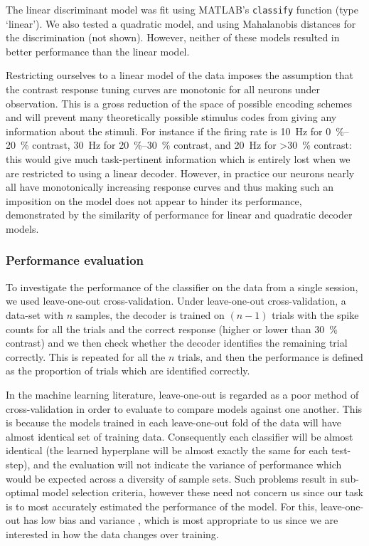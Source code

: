 The linear discriminant model was fit using MATLAB's \texttt{classify} function (type `linear').
We also tested a quadratic model, and using Mahalanobis distances for the discrimination (not shown).
However, neither of these models resulted in better performance than the linear model.

Restricting ourselves to a linear model of the data imposes the assumption that the contrast response tuning curves are monotonic for all neurons under observation.
This is a gross reduction of the space of possible encoding schemes and will prevent many theoretically possible stimulus codes from giving any information about the stimuli.
For instance if the firing rate is \SI{10}{Hz} for \SIrange{0}{20}{\percent} contrast, \SI{30}{Hz} for \SIrange{20}{30}{\percent} contrast, and \SI{20}{Hz} for \SI{>30}{\percent} contrast: this would give much task-pertinent information which is entirely lost when we are restricted to using a linear decoder.
However, in practice our neurons nearly all have monotonically increasing response curves and thus making such an imposition on the model does not appear to hinder its performance, demonstrated by the similarity of performance for linear and quadratic decoder models.


\subsubsection{Performance evaluation}

To investigate the performance of the classifier on the data from a single session, we used leave-one-out cross-validation.
Under leave-one-out cross-validation, a data-set with $n$ samples, the decoder is trained on $(n-1)$ trials with the spike counts for all the trials and the correct response (higher or lower than \SI{30}{\percent} contrast) and we then check whether the decoder identifies the remaining trial correctly.
This is repeated for all the $n$ trials, and then the performance is defined as the proportion of trials which are identified correctly.

In the machine learning literature, leave-one-out is regarded as a poor method of cross-validation in order to evaluate to compare models against one another.
This is because the models trained in each leave-one-out fold of the data will have almost identical set of training data.
Consequently each classifier will be almost identical (the learned hyperplane will be almost exactly the same for each test-step), and the evaluation will not indicate the variance of performance which would be expected across a diversity of sample sets.
Such problems result in sub-optimal model selection criteria, however these need not concern us since our task is to most accurately estimated the performance of the model.
For this, leave-one-out has low bias and variance \citep{Zhang2015}, which is most appropriate to us since we are interested in how the data changes over training.

